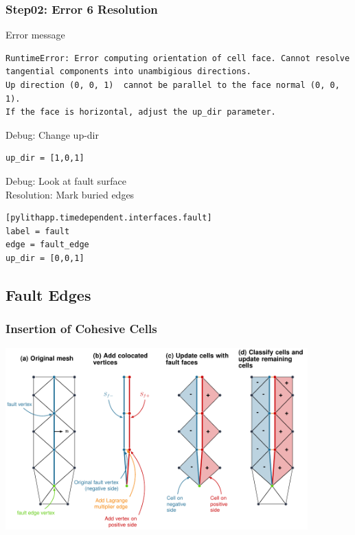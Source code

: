 \documentclass[aspectration=169]{beamer}
\newcommand{\errlabel}[1]{{\small \color{blue}#1}}
\newcommand{\debuginfo}[1]{{\small \color{green}#1}}
\begin{document}
\begin{frame}[fragile]
  \frametitle{Step02: Error 6 Resolution}

\errlabel{Error message}
\begin{lstlisting}
RuntimeError: Error computing orientation of cell face. Cannot resolve tangential components into unambigious directions.
Up direction (0, 0, 1)  cannot be parallel to the face normal (0, 0, 1).
If the face is horizontal, adjust the up_dir parameter.
\end{lstlisting}\pause
\errlabel{Debug:} \debuginfo{Change up-dir}
\begin{lstlisting}
up_dir = [1,0,1]
\end{lstlisting}\pause
\errlabel{Debug:} \debuginfo{Look at fault surface}\pause\\
\errlabel{Resolution:} \debuginfo{Mark buried edges}
\begin{lstlisting}
[pylithapp.timedependent.interfaces.fault]
label = fault
edge = fault_edge
up_dir = [0,0,1]
\end{lstlisting}

\end{frame}


\subsection{Fault Edges}

\begin{frame}
  \frametitle{Insertion of Cohesive Cells}
  \summary{}

  \begin{center}
    \includegraphics[height=7.0cm]{figs/cohesivecells}
  \end{center}

\end{frame}
\end{document}
